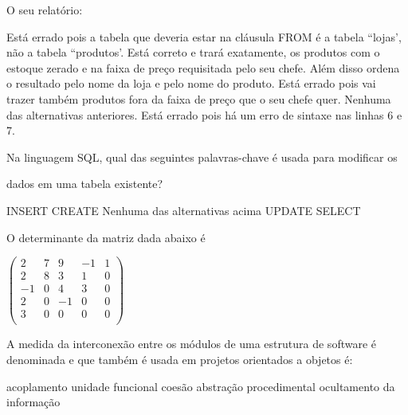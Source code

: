 \documentclass[12pt, addpoints]{exam}
\begin{document}
\begin{questions}
O seu relatório:
\begin{choices}
\choice Está errado pois a tabela que deveria estar na cláusula FROM é a tabela ``lojas', não a tabela ``produtos'.
\choice Está correto e trará exatamente, os produtos com o estoque zerado e na faixa de preço requisitada pelo seu chefe. Além disso ordena o resultado pelo nome da loja e pelo nome do produto.
\choice Está errado pois vai trazer também produtos fora da faixa de preço que o seu chefe quer.
\choice Nenhuma das alternativas anteriores.
\choice Está errado pois há um erro de sintaxe nas linhas 6 e 7.
\end{choices}

\question

Na linguagem SQL, qual das seguintes palavras-chave é usada para modificar os

dados em uma tabela existente?


\begin{choices}
\choice INSERT
\choice CREATE
\choice Nenhuma das alternativas acima
\choice UPDATE
\choice SELECT
\end{choices}

\question

O determinante da matriz dada abaixo é

$\begin{pmatrix}

2 & 7 & 9 & -1 & 1 \\

2 & 8 & 3 & 1 & 0 \\

-1 & 0 & 4 & 3 & 0 \\

2 & 0 & -1 & 0 & 0 \\

3 & 0 & 0 & 0 & 0 \\

\end{pmatrix}$
\begin{choices}
\end{choices}

\question

A medida da interconexão entre os módulos de uma estrutura de software é denominada e que também é usada em projetos orientados a objetos é: 
\begin{choices}
\choice acoplamento
\choice unidade funcional
\choice coesão
\choice abstração procedimental
\choice ocultamento da informação
\end{choices}


\end{questions}
\end{document}
